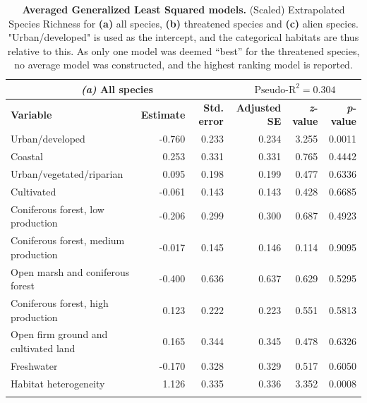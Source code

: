 \documentclass{article}
\begin{document}
\FloatBarrier
\begin{table}[h]
    \caption{\textbf{Averaged Generalized Least Squared models.} (Scaled) Extrapolated Species Richness for \textbf{(a)} all species, \textbf{(b)} threatened species and \textbf{(c)} alien species. "Urban/developed" is used as the intercept, and the categorical habitats are thus relative to this. As only one model was deemed ``best'' for the threatened species, no average model was constructed, and the highest ranking model is reported.}
    \label{table:model_parameters.std}
    \begin{tabular}{l r r r r r}
    \multicolumn{3}{c}{\textbf{\textit{(a)}  All species}} & \multicolumn{3}{c}{$\text{Pseudo-R}^2 = 0.304$} \\
    \hline
    \textbf{Variable} & \textbf{Estimate} & \textbf{Std. error} & \textbf{Adjusted SE} & \textbf{\textit{z}-value} & \textbf{\textit{p}-value} \\
    \hline
    Urban/developed                         & -0.760   & 0.233     & 0.234       & 3.255    & 0.0011    \\
    Coastal                                 & 0.253    & 0.331     & 0.331       & 0.765    & 0.4442    \\
    Urban/vegetated/riparian                & 0.095    & 0.198     & 0.199       & 0.477    & 0.6336    \\
    Cultivated                              & -0.061   & 0.143     & 0.143       & 0.428    & 0.6685    \\
    Coniferous forest, low production       & -0.206   & 0.299     & 0.300       & 0.687    & 0.4923    \\
    Coniferous forest, medium production    & -0.017   & 0.145     & 0.146       & 0.114    & 0.9095    \\
    Open marsh and coniferous forest        & -0.400   & 0.636     & 0.637       & 0.629    & 0.5295    \\
    Coniferous forest, high production      & 0.123    & 0.222     & 0.223       & 0.551    & 0.5813    \\
    Open firm ground and cultivated land    & 0.165    & 0.344     & 0.345       & 0.478    & 0.6326    \\
    Freshwater                              & -0.170   & 0.328     & 0.329       & 0.517    & 0.6050    \\
    Habitat heterogeneity                   & 1.126    & 0.335     & 0.336       & 3.352    & 0.0008    \\
    \hline
    & & & & & \\
    

\end{tabular}
\end{table}
\end{document}
